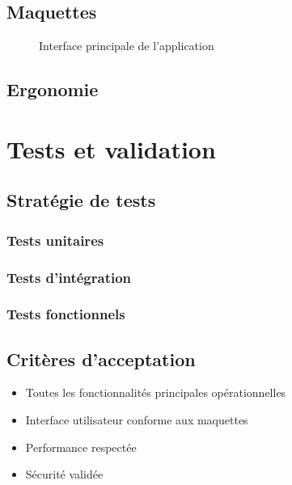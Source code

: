 \documentclass[12pt,a4paper]{article}
\begin{document}
\subsection{Maquettes}

\lipsum[13]

\begin{figure}[h]
\centering
{}
\caption{Interface principale de l'application}
\end{figure}

\subsection{Ergonomie}

\lipsum[14]

\section{Tests et validation}

\subsection{Stratégie de tests}

\subsubsection{Tests unitaires}
\lipsum[15]

\subsubsection{Tests d'intégration}
\lipsum[16]

\subsubsection{Tests fonctionnels}
\lipsum[17]

\subsection{Critères d'acceptation}

\begin{itemize}
    \item Toutes les fonctionnalités principales opérationnelles
    \item Interface utilisateur conforme aux maquettes
    \item Performance respectée
    \item Sécurité validée
\end{itemize}
\end{document}
